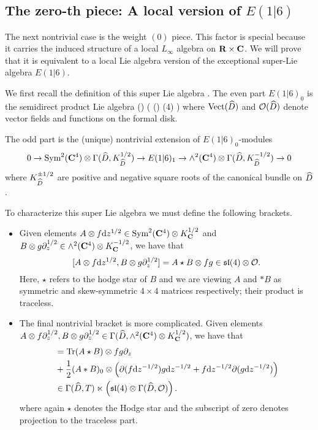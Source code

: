 \documentclass[../main.tex]{subfiles}
\begin{document}




\subsection{The zero-th piece: A local version of $E(1|6)$}
\parsec[] The next nontrivial case is the weight ${(0)}$ piece. This factor is special because it carries the induced structure of a local $L_\infty$ algebra on $\mathbf{R}\times \mathbf{C}$. We will prove that it is equivalent to a local Lie algebra version of the exceptional super-Lie algebra $E(1|6)$. 

We first recall the definition of this super Lie algebra \cite{KacBible}. 
The even part $E(1|6)_0$ is the semidirect product Lie algebra 
\beqn
\Vect() \ltimes \left( \cO() \otimes {}(4) \right )
\eeqn
where $\Vect(\Hat{D})$ and $\cO(\Hat{D})$ denote vector fields and functions on the formal disk.

The odd part is the (unique) nontrivial extension of $E(1|6)_0$-modules 
\[0\to \Sym^2 (\C^4)\otimes \Gamma(\Hat{D}, K^{1/2}_{\Hat{D}}) \to E(1|6)_1 \to \wedge^2 (\C^4) \otimes \Gamma(\Hat{D}, K^{-1/2}_{\Hat{D}}) \to 0 
\]
where $K^{\pm 1/2}_{\Hat{D}}$ are positive and negative square roots of the canonical bundle on $\Hat{D}$.

To characterize this super Lie algebra we must define the following brackets.
\begin{itemize}
\item Given elements $A \otimes f \mathrm{d} z^{1/2}\in \text{Sym}^2 (\mathbf{C}^4)\otimes K^{1/2}_{\mathbf{C}}$ and $B\otimes g \partial_z^{1/2}\in \wedge^2 (\mathbf{C}^4)\otimes K^{-1/2}_{\mathbf{C}}$, we have that
\[
[A \otimes f \mathrm{d} z^{1/2}, B\otimes g \partial_z^{1/2}] = A \star B \otimes fg \in \mathfrak{sl}(4)\otimes \mathcal{O}.
\]
Here, $\star$ refers to the hodge star of $B$ and we are viewing $A$ and $*B$ as symmetric and skew-symmetric $4\times 4$ matrices respectively; their product is traceless. 

\item The final nontrivial bracket is more complicated. 
Given elements $A \otimes f \partial_z^{1/2}, B\otimes g \partial_z^{1/2} \in \Gamma( \widehat D, \wedge^2 (\mathbf{C}^4) \otimes K^{1/2}_{\mathbf{C}})$, we have that 
\begin{align*}
[A\otimes f \d z^{-1/2} , B \otimes g \d z^{-1/2} ] & = \tr (A \star B) \otimes fg \del_z \\ & + \frac12 (A*B)_0 \otimes \left (\del (f \d z^{-1/2} ) g \d z^{-1/2} + f \d z^{-1/2} \del (g \d z^{-1/2} ) \right ) \\
& \in \Gamma (\hat D, T) \ltimes \left (\mf {sl}(4) \otimes \Gamma (\hat D, \mc O) \right ) .
\end{align*}
where again $\star$ denotes the Hodge star and the subscript of zero denotes projection to the traceless part. 
\end{itemize}
\end{document}
